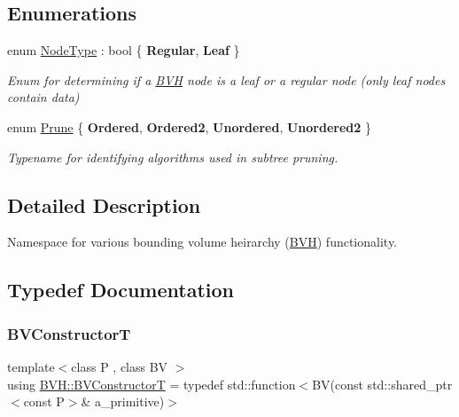 \subsection*{Enumerations}
\begin{DoxyCompactItemize}
\item 
\mbox{\label{namespaceBVH_a7613f83a60cfae9aba31861110bd9e54}} 
enum \hyperlink{namespaceBVH_a7613f83a60cfae9aba31861110bd9e54}{Node\+Type} \+: bool \{ {\bfseries Regular}, 
{\bfseries Leaf}
 \}\begin{DoxyCompactList}\small\item\em Enum for determining if a \hyperlink{namespaceBVH}{B\+VH} node is a leaf or a regular node (only leaf nodes contain data) \end{DoxyCompactList}
\item 
\mbox{\label{namespaceBVH_a3ddb7b34ac1deb3baed2f32d9eacbe5b}} 
enum \hyperlink{namespaceBVH_a3ddb7b34ac1deb3baed2f32d9eacbe5b}{Prune} \{ {\bfseries Ordered}, 
{\bfseries Ordered2}, 
{\bfseries Unordered}, 
{\bfseries Unordered2}
 \}\begin{DoxyCompactList}\small\item\em Typename for identifying algorithms used in subtree pruning. \end{DoxyCompactList}
\end{DoxyCompactItemize}


\subsection{Detailed Description}
Namespace for various bounding volume heirarchy (\hyperlink{namespaceBVH}{B\+VH}) functionality. 

\subsection{Typedef Documentation}
\mbox{\label{namespaceBVH_a245702d7eff40cdaedb5dff68c25a88a}} 
\subsubsection{\texorpdfstring{B\+V\+ConstructorT}{BVConstructorT}}
{\footnotesize\ttfamily template$<$class P , class BV $>$ \\
using \hyperlink{namespaceBVH_a245702d7eff40cdaedb5dff68c25a88a}{B\+V\+H\+::\+B\+V\+ConstructorT} = typedef std\+::function$<$BV(const std\+::shared\+\_\+ptr$<$const P$>$\& a\+\_\+primitive)$>$}



